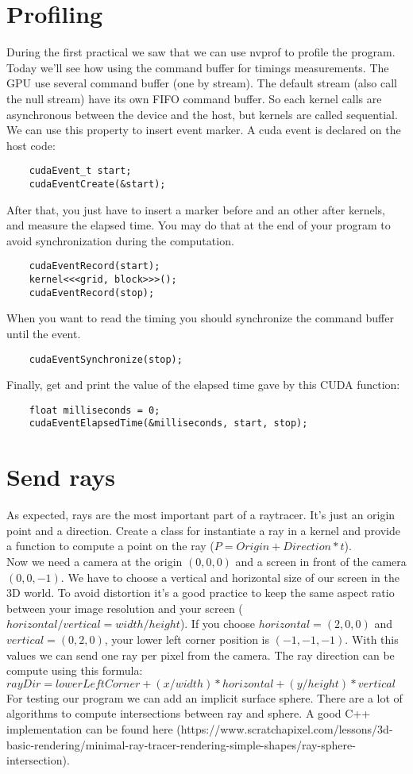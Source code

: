 \documentclass{article}
\begin{document}
\section{Profiling}
During the first practical we saw that we can use nvprof to profile the program. Today we'll see how using the command buffer for timings measurements. The GPU use several command buffer (one by stream). The default stream (also call the null stream) have its own FIFO command buffer. So each kernel calls are asynchronous between the device and the host, but kernels are called sequential. We can use this property to insert event marker. A cuda event is declared on the host code:
\begin{lstlisting}
	cudaEvent_t start;
	cudaEventCreate(&start);
\end{lstlisting}
After that, you just have to insert a marker before and an other after kernels, and measure the elapsed time. You may do that at the end of your program to avoid synchronization during the computation.
\begin{lstlisting}
	cudaEventRecord(start);
	kernel<<<grid, block>>>();
	cudaEventRecord(stop);
\end{lstlisting}
When you want to read the timing you should synchronize the command buffer until the event.
\begin{lstlisting}
	cudaEventSynchronize(stop);
\end{lstlisting}
Finally, get and print the value of the elapsed time gave by this CUDA function:
\begin{lstlisting}
	float milliseconds = 0;
	cudaEventElapsedTime(&milliseconds, start, stop);
\end{lstlisting}

\section{Send rays}
As expected, rays are the most important part of a raytracer. It's just an origin point and a direction. Create a class for instantiate a ray in a kernel and provide a function to compute a point on the ray ($P = Origin + Direction*t$).\\
Now we need a camera at the origin $(0, 0, 0)$ and a screen in front of the camera $(0, 0, -1)$. We have to choose a vertical and horizontal size of our screen in the 3D world. To avoid distortion it's a good practice to keep the same aspect ratio between your image resolution and your screen ($horizontal/vertical = width/height$). If you choose $horizontal = (2, 0, 0)$ and $vertical = (0, 2, 0)$, your lower left corner position is $(-1, -1, -1)$. With this values we can send one ray per pixel from the camera. The ray direction can be compute using this formula: $rayDir = lowerLeftCorner + (x/width)*horizontal + (y/height)*vertical$\\
For testing our program we can add an implicit surface sphere. There are a lot of algorithms to compute intersections between ray and sphere. A good C++ implementation can be found here (https://www.scratchapixel.com/lessons/3d-basic-rendering/minimal-ray-tracer-rendering-simple-shapes/ray-sphere-intersection).
\end{document}
